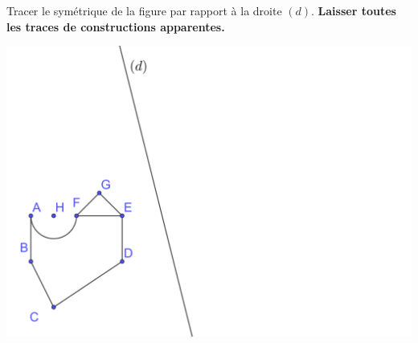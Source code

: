 \documentclass[a4paper,11pt]{exam}
\begin{document}
	\newpage 
	\section{\ }
	
	Tracer le symétrique de la figure par rapport à la droite $(d)$. \textbf{Laisser toutes les traces de constructions apparentes.}
	
	\begin{center}
		\includegraphics[scale=0.2]{img/fig3_2}
	\end{center}
	\label{LastPage}
\end{document}
